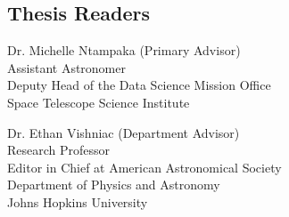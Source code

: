 

\Blindtext[3]




\begin{singlespace}

    \section*{Thesis Readers}
    
    Dr. Michelle Ntampaka (Primary Advisor)\\
    Assistant Astronomer\\
    Deputy Head of the Data Science Mission Office\\
    Space Telescope Science Institute

    \vspace{0.1in}
    
    Dr. Ethan Vishniac (Department Advisor)\\
    Research Professor\\
    Editor in Chief at American Astronomical Society\\
    Department of Physics and Astronomy\\
    Johns Hopkins University



\end{singlespace}